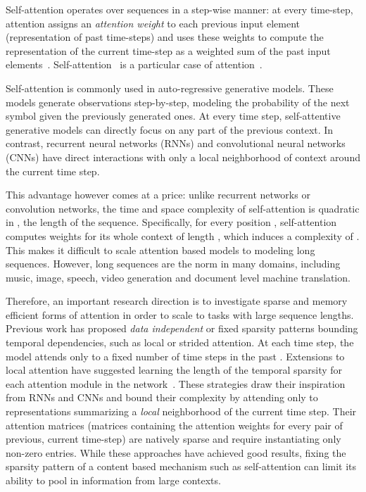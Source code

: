\documentclass[a4paper]{article}
\begin{document}
Self-attention operates over sequences in a step-wise manner: at 
every time-step, attention assigns an \emph{attention weight} to each 
previous input element (representation 
of past time-steps) and uses these weights to compute the representation of the current 
time-step as a weighted sum of the past input elements~\citep{vaswani2017attention}. 
Self-attention~\citep{shaw2018self} is a particular case of attention~\citep{bahdanau2014neural,chorowski2015attention,luong2015effective}.

Self-attention is commonly used in auto-regressive generative models.
These models generate observations step-by-step, modeling the probability 
of the next symbol given the previously generated ones. At every time step, 
self-attentive generative models can directly focus on any part of the 
previous context. In contrast, recurrent neural networks (RNNs) and 
convolutional neural networks (CNNs) have direct interactions with only a 
local neighborhood of context around the current time step. 

This advantage however comes at a price: unlike recurrent networks or 
convolution networks, the time and space complexity of self-attention 
is quadratic in , the length of the sequence. Specifically, for every
position , self-attention computes weights for its whole context of 
length , which induces a complexity of .
This makes it difficult to scale attention based models 
to modeling long sequences. However, long sequences 
are the norm in many domains, including music, image, speech, video generation
and document level machine translation.

Therefore, an important research direction is to investigate sparse and 
memory efficient forms of attention in order to scale to tasks with large 
sequence lengths.
Previous work has proposed \emph{data independent} or fixed sparsity patterns bounding 
temporal dependencies, such as local or strided attention. At each time step, the model 
attends only to a fixed number of time steps in the past \citep{child2019generating}. 
Extensions to local attention have suggested learning the length of the temporal sparsity 
for each attention module in the network~\citep{sukhbaatar2019adaptive}. 
These strategies draw their inspiration from RNNs and CNNs and bound their 
complexity by attending only to representations summarizing a \emph{local}
neighborhood of the current time step. Their attention matrices (matrices containing
the attention weights for every pair of previous, current time-step) are natively sparse
and require instantiating only non-zero entries. While these approaches have achieved good results, fixing the sparsity pattern of a content based mechanism such as self-attention can limit its ability to pool in information from large contexts. 
\end{document}
